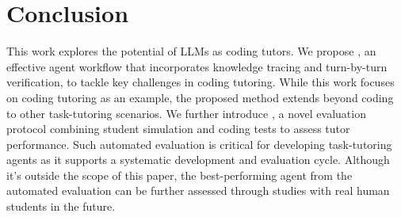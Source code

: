 \section{Conclusion}

This work explores the potential of LLMs as coding tutors.  
We propose \model, an effective agent workflow that incorporates knowledge tracing and turn-by-turn verification, to tackle key challenges in coding tutoring. 
While this work focuses on coding tutoring as an example, the proposed method extends beyond coding to other task-tutoring scenarios.
We further introduce \eval, a novel evaluation protocol combining student simulation and coding tests to assess tutor performance.
Such automated evaluation is critical for developing task-tutoring agents as it supports a systematic development and evaluation cycle. Although it's outside the scope of this paper, the best-performing agent from the automated evaluation can be further assessed through studies with real human students in the future. 
